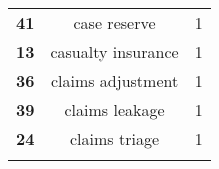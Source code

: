 \documentclass[]{book}
\theoremstyle{definition}
\theoremstyle{definition}
\theoremstyle{definition}
\theoremstyle{remark}
\begin{document}
\begin{longtable}[]{@{}ccc@{}}
\begin{minipage}[t]{0.11\columnwidth}\centering\strut
\textbf{41}\strut
\end{minipage} & \begin{minipage}[t]{0.42\columnwidth}\centering\strut
case reserve\strut
\end{minipage} & \begin{minipage}[t]{0.29\columnwidth}\centering\strut
1\strut
\end{minipage}\tabularnewline
\begin{minipage}[t]{0.11\columnwidth}\centering\strut
\textbf{13}\strut
\end{minipage} & \begin{minipage}[t]{0.42\columnwidth}\centering\strut
casualty insurance\strut
\end{minipage} & \begin{minipage}[t]{0.29\columnwidth}\centering\strut
1\strut
\end{minipage}\tabularnewline
\begin{minipage}[t]{0.11\columnwidth}\centering\strut
\textbf{36}\strut
\end{minipage} & \begin{minipage}[t]{0.42\columnwidth}\centering\strut
claims adjustment\strut
\end{minipage} & \begin{minipage}[t]{0.29\columnwidth}\centering\strut
1\strut
\end{minipage}\tabularnewline
\begin{minipage}[t]{0.11\columnwidth}\centering\strut
\textbf{39}\strut
\end{minipage} & \begin{minipage}[t]{0.42\columnwidth}\centering\strut
claims leakage\strut
\end{minipage} & \begin{minipage}[t]{0.29\columnwidth}\centering\strut
1\strut
\end{minipage}\tabularnewline
\begin{minipage}[t]{0.11\columnwidth}\centering\strut
\textbf{24}\strut
\end{minipage} & \begin{minipage}[t]{0.42\columnwidth}\centering\strut
claims triage\strut
\end{minipage} & \begin{minipage}[t]{0.29\columnwidth}\centering\strut
1\strut
\end{minipage}\tabularnewline
\begin{minipage}[t]{0.11\columnwidth}\centering\strut

\end{minipage}
\end{longtable}
\end{document}

